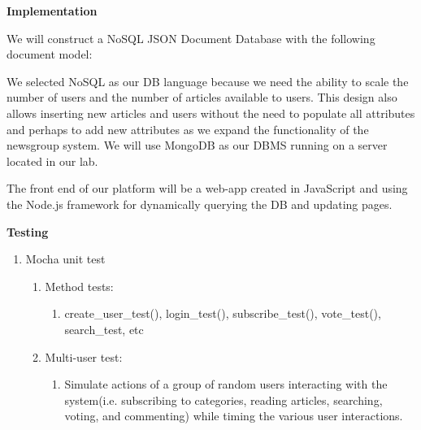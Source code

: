 \documentclass[]{article}
\begin{document}
\textbf{Implementation}

We will construct a NoSQL JSON Document Database with the following
document model:

We selected NoSQL as our DB language because we need the ability to
scale the number of users and the number of articles available to users.
This design also allows inserting new articles and users without the
need to populate all attributes and perhaps to add new attributes as we
expand the functionality of the newsgroup system. We will use MongoDB as
our DBMS running on a server located in our lab.

The front end of our platform will be a web-app created in JavaScript
and using the Node.js framework for dynamically querying the DB and
updating pages.

\textbf{Testing}

\begin{enumerate}
\def\labelenumi{\arabic{enumi}.}
\item
  Mocha unit test

  \begin{enumerate}
  \def\labelenumii{\alph{enumii}.}
  \item
    Method tests:

    \begin{enumerate}
    \def\labelenumiii{\roman{enumiii}.}
    \item
      create\_user\_test(), login\_test(), subscribe\_test(),
      vote\_test(), search\_test, etc
    \end{enumerate}
  \item
    Multi-user test:

    \begin{enumerate}
    \def\labelenumiii{\roman{enumiii}.}
    \item
      Simulate actions of a group of random users interacting with the
      system(i.e. subscribing to categories, reading articles,
      searching, voting, and commenting) while timing the various user
      interactions.
    \end{enumerate}
  \end{enumerate}
\end{enumerate}
\end{document}
